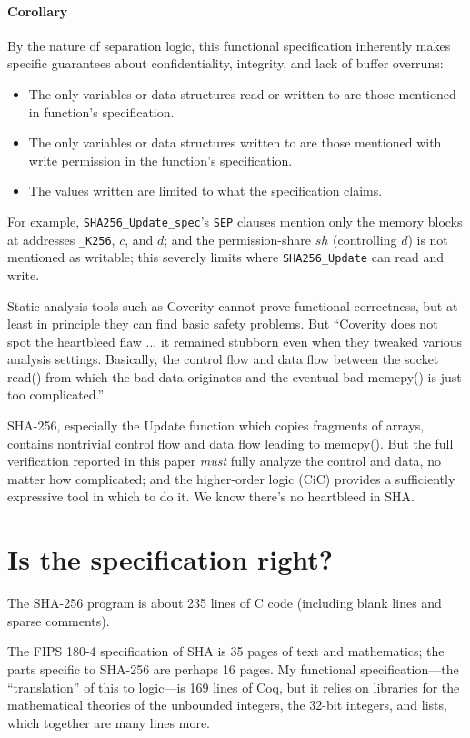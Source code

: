 \documentclass[prodmode,acmtoplas]{acmsmall}
\begin{document}
\paragraph{Corollary}
By the nature of separation logic, this functional
specification inherently makes specific guarantees
about confidentiality, integrity, and 
lack of buffer overruns:
\begin{itemize}
\item The only variables or data structures
read or written to are those 
mentioned in function's specification.
\item The only variables or data structures
written to are those 
mentioned with write permission
in the function's specification.
\item The values written are limited to what
the specification claims.
\end{itemize}
For example, \lstinline{SHA256_Update_spec}'s
\lstinline{SEP} clauses mention only
the memory blocks at addresses 
\lstinline{_K256}, $\mathit{c}$, and $d$;
and the permission-share $\mathit{sh}$ (controlling $d$) 
is not mentioned as writable; this severely limits
where \lstinline{SHA256_Update} can read and write.

Static analysis tools such as Coverity cannot prove functional
correctness, but at least in principle they can find basic safety
problems.  But ``Coverity does not spot the heartbleed flaw ... it
remained stubborn even when they tweaked various analysis
settings. Basically, the control flow and data flow between the socket
read() from which the bad data originates and the eventual bad
memcpy() is just too complicated.'' \cite{regehr14:coverity}

SHA-256, especially the Update function which copies fragments of arrays,
contains nontrivial control flow and data flow leading to memcpy().
But the full verification reported in this paper
\emph{must} fully analyze the control and data, no matter how complicated;
and the higher-order logic (CiC) provides a sufficiently expressive
tool in which to do it.  We know there's no heartbleed in SHA.

\section{Is the specification right?}
\label{sec:specright}
The SHA-256 program is about 235 lines
of C code
(including blank lines and sparse comments).

The FIPS 180-4 specification of SHA is 35 pages of 
text and mathematics; the parts specific to SHA-256
are perhaps 16 pages.  My functional specification---the
``translation'' of this to logic---is 169 lines of Coq,
but it relies on libraries for the mathematical
theories of the unbounded integers, the 32-bit integers,
and lists, which together are many lines more.
\end{document}

